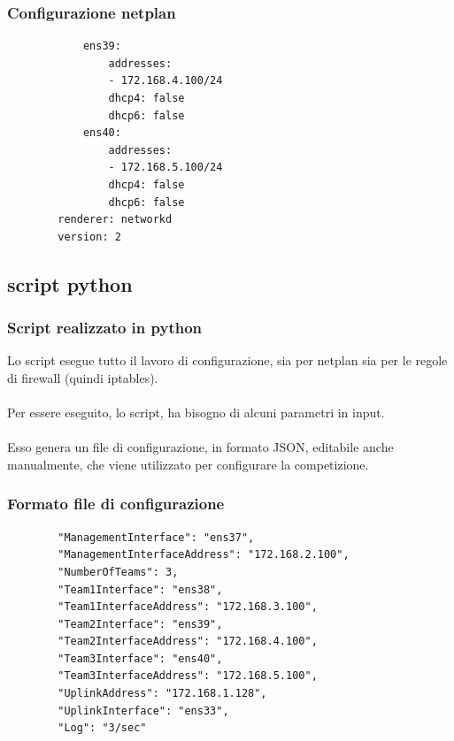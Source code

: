 \documentclass{beamer}
\begin{document}
\begin{frame}[fragile]
    \frametitle{Configurazione netplan}
    \begin{lstlisting}
            ens39:
                addresses:
                - 172.168.4.100/24
                dhcp4: false
                dhcp6: false
            ens40:
                addresses:
                - 172.168.5.100/24
                dhcp4: false
                dhcp6: false
        renderer: networkd
        version: 2
    \end{lstlisting}
\end{frame}


\subsection*{script python}
\begin{frame}
    \frametitle{Script realizzato in python}

    Lo script esegue tutto il lavoro di configurazione, sia per netplan sia per le regole di firewall (quindi iptables).
    \\~\\
    Per essere eseguito, lo script, ha bisogno di alcuni parametri in input.
    \\~\\
    Esso genera un file di configurazione, in formato JSON, editabile anche manualmente, che viene utilizzato per configurare la competizione.

\end{frame}

\begin{frame}[fragile]
    \frametitle{Formato file di configurazione}
    \begin{lstlisting}
        "ManagementInterface": "ens37",
        "ManagementInterfaceAddress": "172.168.2.100",
        "NumberOfTeams": 3,
        "Team1Interface": "ens38",
        "Team1InterfaceAddress": "172.168.3.100",
        "Team2Interface": "ens39",
        "Team2InterfaceAddress": "172.168.4.100",
        "Team3Interface": "ens40",
        "Team3InterfaceAddress": "172.168.5.100",
        "UplinkAddress": "172.168.1.128",
        "UplinkInterface": "ens33",
        "Log": "3/sec"
    \end{lstlisting}
\end{frame}
\end{document}
